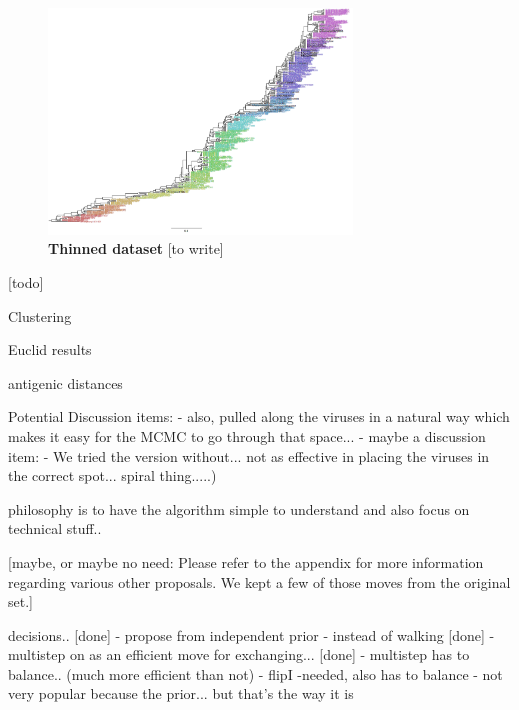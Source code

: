 \documentclass[11pt,oneside,letterpaper]{article}
\begin{document}
\begin{figure}[h]
	\centering		
	\includegraphics[width=0.72\textwidth]{figures/thinnedData-MCC-figTree-50M}
	\caption{\textbf{Thinned dataset} 
[to write]
	} 
	\label{MyLabel} 
\end{figure}


\newpage

[todo]


Clustering

Euclid results

antigenic distances





Potential Discussion items:
  - also, pulled along the viruses in a natural way which makes it easy for the MCMC to go through that space...
  - maybe a discussion item: - We tried the version without... not as effective in placing the viruses in the correct spot... spiral thing.....)


philosophy is to have the algorithm simple to understand and also focus on technical stuff..


\newpage












\newpage


[maybe, or maybe no need: Please refer to the appendix for more information regarding various other proposals.
We kept a few of those moves from the original set.]

 decisions..
[done]     - propose from independent prior  - instead of walking
[done]     - multistep on as an efficient move for exchanging...
[done]	     - multistep has to balance.. (much more efficient than not)
     - flipI
	-needed, also has to balance
	- not very popular because the prior... but that's the way it is
\end{document}
